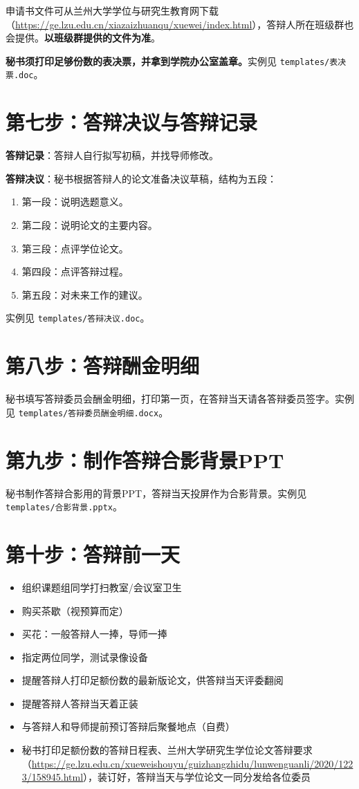 \documentclass[12pt,a4paper,openany]{ctexbook}
\newcommand{\todoitem}[1]{\item[\textcolor{lzublue}{$\square$}] #1}
\newcommand{\important}[1]{\textbf{\color{red}#1}}
\begin{document}
申请书文件可从兰州大学学位与研究生教育网下载（\url{https://ge.lzu.edu.cn/xiazaizhuanqu/xuewei/index.html}），答辩人所在班级群也会提供。\textbf{以班级群提供的文件为准}。

\important{秘书须打印足够份数的表决票，并拿到学院办公室盖章。}实例见 \texttt{templates/表决票.doc}。

\section{第七步：答辩决议与答辩记录}

\textbf{答辩记录}：答辩人自行拟写初稿，并找导师修改。

\textbf{答辩决议}：秘书根据答辩人的论文准备决议草稿，结构为五段：

\begin{enumerate}
  \item 第一段：说明选题意义。
  \item 第二段：说明论文的主要内容。
  \item 第三段：点评学位论文。
  \item 第四段：点评答辩过程。
  \item 第五段：对未来工作的建议。
\end{enumerate}

实例见 \texttt{templates/答辩决议.doc}。

\section{第八步：答辩酬金明细}

秘书填写答辩委员会酬金明细，打印第一页，在答辩当天请各答辩委员签字。实例见 \texttt{templates/答辩委员酬金明细.docx}。

\section{第九步：制作答辩合影背景PPT}

秘书制作答辩合影用的背景PPT，答辩当天投屏作为合影背景。实例见 \texttt{templates/合影背景.pptx}。

\section{第十步：答辩前一天}

\begin{itemize}
  \todoitem{组织课题组同学打扫教室/会议室卫生}
  \todoitem{购买茶歇（视预算而定）}
  \todoitem{买花：一般答辩人一捧，导师一捧}
  \todoitem{指定两位同学，测试录像设备}
  \todoitem{提醒答辩人打印足额份数的最新版论文，供答辩当天评委翻阅}
  \todoitem{提醒答辩人答辩当天着正装}
  \todoitem{与答辩人和导师提前预订答辩后聚餐地点（自费）}
  \todoitem{秘书打印足额份数的答辩日程表、兰州大学研究生学位论文答辩要求（\url{https://ge.lzu.edu.cn/xueweishouyu/guizhangzhidu/lunwenguanli/2020/1223/158945.html}），装订好，答辩当天与学位论文一同分发给各位委员}
\end{itemize}
\end{document}

